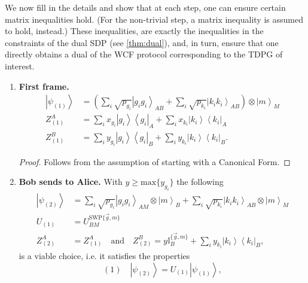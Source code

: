 \documentclass{theoretics}
\newcommand{\atul}[1]{#1} %
\begin{document}
We now fill in the  details and show that at each step, one can ensure certain matrix inequalities hold. (For the non-trivial step, a matrix inequality is assumed to hold, instead.) These inequalities, \atul{are exactly the inequalities in the constraints of the dual SDP (see \cref{thm:dual})}, and, in turn, ensure that one directly obtains a dual of the WCF protocol corresponding to the TDPG of interest.
%

\begin{enumerate}
  \item \textbf{First frame.}
        \begin{align*}
          \left|\psi_{(1)}\right\rangle & =\left(\sum_{i}\sqrt{p_{g_{i}}}\left|g_{i}g_{i}\right\rangle _{AB}+\sum_{i}\sqrt{p_{k_{i}}}\left|k_{i}k_{i}\right\rangle _{AB}\right)\otimes\left|m\right\rangle _{M} \\
          Z_{(1)}^{A}                   & =\sum_{i}x_{g_{i}}\left|g_{i}\right\rangle \left\langle g_{i}\right|_{A}+\sum_{i}x_{k_{i}}\left|k_{i}\right\rangle \left\langle k_{i}\right|_{A}                      \\
          Z_{(1)}^{B}                   & =\sum_{i}y_{g_{i}}\left|g_{i}\right\rangle \left\langle g_{i}\right|_{B}+\sum_{i}y_{k_{i}}\left|k_{i}\right\rangle \left\langle k_{i}\right|_{B}.
        \end{align*}
        \begin{proof}
          Follows from the assumption of starting with a Canonical Form.
        \end{proof}
  \item \textbf{Bob sends to Alice.} With $y\ge\text{max}\{y_{g_{i}}\}$ the
        following
        \begin{align*}
          \left|\psi_{(2)}\right\rangle & =\sum_{i}\sqrt{p_{g_{i}}}\left|g_{i}g_{i}\right\rangle _{AM}\otimes\left|m\right\rangle _{B}+\sum_{i}\sqrt{p_{k_{i}}}\left|k_{i}k_{i}\right\rangle _{AB}\otimes\left|m\right\rangle _{M} \\
          U_{(1)}                       & =U_{BM}^{\text{SWP}\{\vec{g},m\}}                                                                                                                                                        \\
          Z_{(2)}^{A}                   & =Z_{(1)}^{A}\ \ \ \text{ and }\ \ \
          Z_{(2)}^{B}  =y\mathbb{I}_{B}^{\{\vec{g},m\}}+\sum_{i}y_{k_{i}}\left|k_{i}\right\rangle \left\langle k_{i}\right|_{B},
        \end{align*}
        is a viable choice, i.e. it satisfies the properties  $$(1)\quad \left|\psi_{(2)}\right\rangle =U_{(1)}\left|\psi_{(1)}\right\rangle, $$

\end{enumerate}
\end{document}
